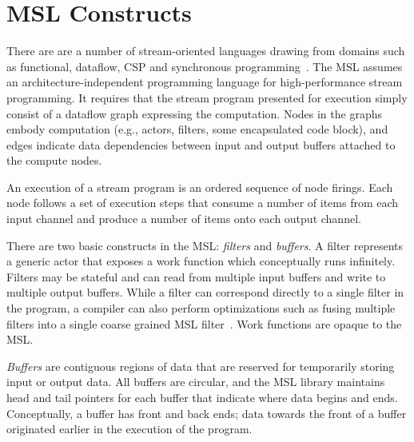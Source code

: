 \section{MSL Constructs}

There are are a number of stream-oriented languages drawing from
domains such as functional, dataflow, CSP and synchronous
programming~\cite{survey97}. The MSL assumes an architecture-independent
programming language for high-performance stream programming. It
requires that the stream program presented for execution simply
consist of a dataflow graph expressing the computation. Nodes in the
graphs embody computation (e.g., actors, filters, some encapsulated
code block), and edges indicate data dependencies between
input and output buffers attached to the compute nodes.

An execution of a stream program is an ordered sequence of node
firings. Each node follows a set of execution steps that consume a
number of items from each input channel and produce a number of items
onto each output channel.

There are two basic constructs in the MSL: \emph{filters} and
\emph{buffers}. A filter represents a generic actor that exposes a
work function which conceptually runs infinitely. Filters may be
stateful and can read from multiple input buffers and write to multiple
output buffers. While a filter can correspond directly to a
single filter in the program, a compiler can also perform
optimizations such as fusing multiple filters into a single
coarse grained MSL filter~\cite{asplos02}. Work functions are opaque to the MSL.

\emph{Buffers} are contiguous regions of data that are reserved for
temporarily storing input or output data. All buffers are circular,
and the MSL library maintains head and tail pointers for each buffer
that indicate where data begins and ends. Conceptually, a buffer has
front and back ends; data towards the front of a buffer originated
earlier in the execution of the program.

